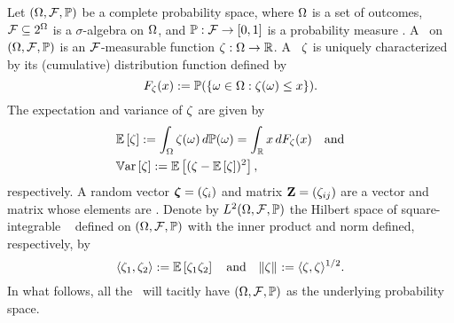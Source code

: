 Let $(\Omega, \mathcal{F}, \mathbb{P})$ be a complete probability space, where $\Omega$ is a set of outcomes, $\mathcal{F} \subseteq 2^\Omega$ is a $\sigma$-algebra on $\Omega$, and $\mathbb{P}: \mathcal{F} \to [0, 1]$ is a probability measure \cite{durrett2010}.
A \rv\ on $(\Omega, \mathcal{F}, \mathbb{P})$ is an $\mathcal{F}$-measurable function $\zeta: \Omega \to \mathbb{R}$.
A \rv\ $\zeta$ is uniquely characterized by its (cumulative) distribution function defined by
\begin{equation*}
  F_\zeta(x) := \mathbb{P}(\{ \omega \in \Omega: \zeta(\omega) \leq x \}).
\end{equation*}
The expectation and variance of $\zeta$ are given by
\begin{align*}
  & \mathbb{E}\left[ \zeta \right] := \int_\Omega \zeta(\omega) \, d\mathbb{P}(\omega) = \int_{\mathbb{R}} x \, d F_\zeta(x) \hspace{1em} \text{and} \\
  & \mathbb{V}\text{ar}\left[ \zeta \right] := \mathbb{E}\left[ (\zeta - \mathbb{E}\left[ \zeta \right])^2 \right],
\end{align*}
respectively.
A random vector $\bm{\zeta} = (\zeta_i)$ and matrix $\mathbf{Z} = (\zeta_{ij})$ are a vector and matrix whose elements are \rvs.
Denote by $L^{2}(\Omega, \mathcal{F}, \mathbb{P})$ the Hilbert space of square-integrable \rvs\ \cite{janson1997} defined on $(\Omega, \mathcal{F}, \mathbb{P})$ with the inner product and norm defined, respectively, by
\begin{equation*}
  \langle \zeta_1, \zeta_2 \rangle := \mathbb{E}\left[ \zeta_1 \zeta_2 \right] \hspace{1em} \text{and} \hspace{1em} \| \zeta \|_{} := \langle \zeta, \zeta \rangle^{1/2}.
\end{equation*}
In what follows, all the \rvs\ will tacitly have $(\Omega, \mathcal{F}, \mathbb{P})$ as the underlying probability space.
